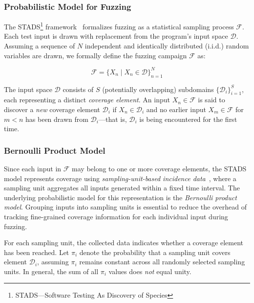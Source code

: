 \documentclass[conference,anonymous,review]{IEEEtran}
\begin{document}
\subsubsection{Probabilistic Model for Fuzzing}
The STADS\footnote{STADS—Software Testing As Discovery of Species} framework~\cite{boehme2018stads,boehme2021residual,nguyen2022bedivfuzz,boehme2020boosting} formalizes
fuzzing as a statistical sampling process $\mathcal{F}$. Each test input is drawn with replacement from the program's input space $\pmb{\mathcal{D}}$. Assuming a sequence of $N$ independent and identically distributed (i.i.d.) random variables are drawn, we formally define the fuzzing campaign $\mathcal{F}$ as:

\begin{equation*}
    \mathcal{F}=\{X_n \mid X_n \in \pmb{\mathcal{D}}\}_{n=1}^N
\end{equation*}

The input space $\pmb{\mathcal{D}}$ consists of $S$ (potentially overlapping) subdomains $\{\mathcal{D}_i\}_{i=1}^S$, each representing a distinct \emph{coverage element}. An input $X_n \in \mathcal{F}$ is said to discover a \emph{new} coverage element $\mathcal{D}_i$ if $X_n \in \mathcal{D}_i$ and no earlier input $X_m \in \mathcal{F}$ for $m < n$ has been drawn from $\mathcal{D}_i$—that is, $\mathcal{D}_i$ is being encountered for the first time.


\subsubsection{Bernoulli Product Model}
Since each input in $\mathcal{F}$ may belong to one or more coverage elements, the STADS model represents coverage using \emph{sampling-unit-based incidence data}~\cite{colwell2012models,chao2017thirty}, where a sampling unit aggregates all inputs generated within a fixed time interval. The underlying probabilistic model for this representation is the \emph{Bernoulli product model}. Grouping inputs into sampling units is essential to reduce the overhead of tracking fine-grained coverage information for each individual input during fuzzing.

For each sampling unit, the collected data indicates whether a coverage element
has been reached. Let $\pi_i$ denote the probability that a sampling unit covers
element $\mathcal{D}_i$, assuming $\pi_i$ remains constant across all randomly
selected sampling units.
In general, the sum of all $\pi_i$ values does \emph{not} equal unity.
\end{document}
